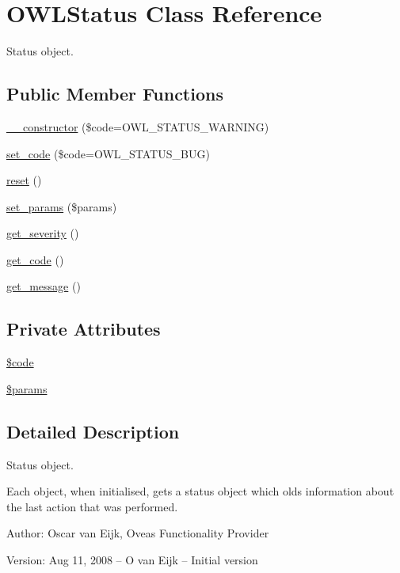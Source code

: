 \hypertarget{classOWLStatus}{
\section{OWLStatus Class Reference}
\label{classOWLStatus}
}
Status object.  


\subsection*{Public Member Functions}
\begin{CompactItemize}
\item 
\hyperlink{classOWLStatus_ff9ed27ec31da2d4f5719aa1d522fea6}{\_\-\_\-constructor} (\$code=OWL\_\-STATUS\_\-WARNING)
\item 
\hyperlink{classOWLStatus_1082207e060022757110d0aedbb524b1}{set\_\-code} (\$code=OWL\_\-STATUS\_\-BUG)
\item 
\hyperlink{classOWLStatus_f3fedee6b36500fe4ecf31e1d51fe5ff}{reset} ()
\item 
\hyperlink{classOWLStatus_65bcaa74291e21685b0ea148dd05cb65}{set\_\-params} (\$params)
\item 
\hyperlink{classOWLStatus_aa7e66cc43cb91798bba0599a3eef435}{get\_\-severity} ()
\item 
\hyperlink{classOWLStatus_efb4d156f33c9197d9691ab9423660fa}{get\_\-code} ()
\item 
\hyperlink{classOWLStatus_f5711d10793d0cf375c3aa9b1a298f94}{get\_\-message} ()
\end{CompactItemize}
\subsection*{Private Attributes}
\begin{CompactItemize}
\item 
\hyperlink{classOWLStatus_3c7c81c1d348dce97be39f5c90472b45}{\$code}
\item 
\hyperlink{classOWLStatus_7d2291be414fbec260732b1c233db5dc}{\$params}
\end{CompactItemize}


\subsection{Detailed Description}
Status object. 

Each object, when initialised, gets a status object which olds information about the last action that was performed. \begin{Desc}
\item[Author:]Oscar van Eijk, Oveas Functionality Provider \end{Desc}
\begin{Desc}
\item[Version:]Aug 11, 2008 -- O van Eijk -- Initial version \end{Desc}


